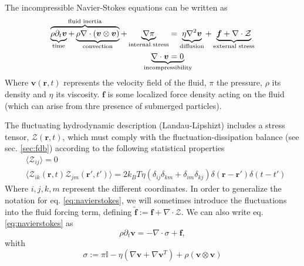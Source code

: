 \documentclass[ twoside,openright,titlepage,numbers=noenddot,%
headinclude,footinclude,cleardoublepage=empty,abstract=on,
BCOR=5mm,paper=a4,fontsize=11pt, dvipsnames
]{scrreprt}
\renewcommand{\vec}[1]{\bm{#1}}
\newcommand{\tens}[1]{\bm{\mathcal{#1}}}
\newcommand{\kT}{k_B T}
\newcommand{\fpos}{r}
\newcommand{\fvel}{v}
\begin{document}
The incompressible Navier-Stokes equations can be written as
\begin{equation}
  \label{eq:navierstokes}
  \begin{aligned}
    \overbrace{\underbrace{\rho\partial_t{\vec{\fvel}}}_{\text{time}} +\underbrace{\rho\nabla\cdot (\vec{\fvel}\otimes\vec{\fvel})}_{\text{convection}}}^{\text{fluid inertia}} + \underbrace{\nabla \pi}_{\text{internal stress}} &= \underbrace{\eta \nabla^2\vec{\fvel}}_{\text{diffusion}} + \underbrace{\vec{f} + \nabla\cdot \mathcal{Z}}_{\text{external stress}}\\
    \nabla\cdot\vec{\fvel} &= 0\quad\mathllap{\underbrace{\phantom{\nabla\cdot\vec{\fvel} = 0}}_{\text{incompressibility}}}
  \end{aligned}
\end{equation}
Where $\vec{\fvel}(\vec{\fpos}, t)$ represents the velocity field of the fluid, $\pi$ the pressure, $\rho$ its density and $\eta$ its viscosity. $\vec{f}$ is some localized force density acting on the fluid (which can arise from thre presence of submerged particles).

The fluctuating hydrodynamic description (Landau-Lipshizt) includes a stress tensor, $\mathcal{Z}(\vec{\fpos}, t)$, which must comply with the fluctuation-dissipation balance (see sec. \ref{sec:fdb}) according to the following statistical properties\cite{Zarate2006}
\begin{equation}
  \label{eq:navierstkesnoise}
  \begin{aligned}
&  \langle \mathcal Z_{ij}\rangle = 0\\
&  \langle \mathcal Z_{ik}(\vec{\fpos},t)\mathcal Z_{jm}(\vec{\fpos}',t')\rangle = 2\kT\eta(\delta_{ij}\delta_{km} + \delta_{im}\delta_{kj})\delta(\vec{\fpos}-\vec{\fpos}')\delta(t-t')
\end{aligned}
\end{equation}
Where $i,j,k,m$ represent the different coordinates.
In order to generalize the notation for eq. \eqref{eq:navierstokes}, we will sometimes introduce the fluctuations into the fluid forcing term, defining $\tilde{\vec{f}} := \vec{f} + \nabla\cdot\mathcal{Z}$.
We can also write eq. \eqref{eq:navierstokes} as
\begin{equation}
  \label{eq:navierstokes2}
  \rho\partial_t\vec{\fvel} = -\nabla\cdot \tens{\sigma} + \vec{f},
\end{equation}
whith
\begin{equation}
  \tens{\sigma} := \pi\mathbb{I} - \eta\left(\nabla \vec{\fvel} + \nabla\vec{\fvel}^T\right) + \rho\left(\vec{\fvel}\otimes\vec{\fvel}\right)
\end{equation}
\end{document}
